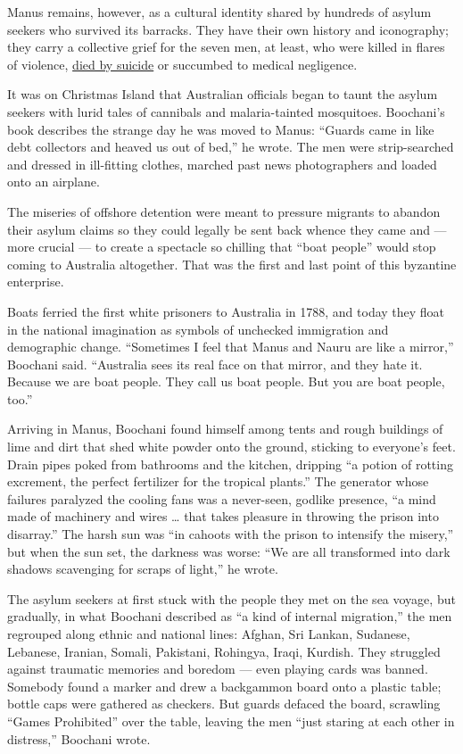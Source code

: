 Manus remains, however, as a cultural identity shared by hundreds of
asylum seekers who survived its barracks. They have their own history
and iconography; they carry a collective grief for the seven men, at
least, who were killed in flares of violence,
\href{https://www.nytimes.com/2019/06/26/world/australia/australia-manus-suicide.html}{died
by suicide} or succumbed to medical negligence.

It was on Christmas Island that Australian officials began to taunt the
asylum seekers with lurid tales of cannibals and malaria-tainted
mosquitoes. Boochani's book describes the strange day he was moved to
Manus: ``Guards came in like debt collectors and heaved us out of bed,''
he wrote. The men were strip-searched and dressed in ill-fitting
clothes, marched past news photographers and loaded onto an airplane.

The miseries of offshore detention were meant to pressure migrants to
abandon their asylum claims so they could legally be sent back whence
they came and --- more crucial --- to create a spectacle so chilling
that ``boat people'' would stop coming to Australia altogether. That was
the first and last point of this byzantine enterprise.

Boats ferried the first white prisoners to Australia in 1788, and today
they float in the national imagination as symbols of unchecked
immigration and demographic change. ``Sometimes I feel that Manus and
Nauru are like a mirror,'' Boochani said. ``Australia sees its real face
on that mirror, and they hate it. Because we are boat people. They call
us boat people. But you are boat people, too.''

Arriving in Manus, Boochani found himself among tents and rough
buildings of lime and dirt that shed white powder onto the ground,
sticking to everyone's feet. Drain pipes poked from bathrooms and the
kitchen, dripping ``a potion of rotting excrement, the perfect
fertilizer for the tropical plants.'' The generator whose failures
paralyzed the cooling fans was a never-seen, godlike presence, ``a mind
made of machinery and wires \ldots{} that takes pleasure in throwing the
prison into disarray.'' The harsh sun was ``in cahoots with the prison
to intensify the misery,'' but when the sun set, the darkness was worse:
``We are all transformed into dark shadows scavenging for scraps of
light,'' he wrote.

The asylum seekers at first stuck with the people they met on the sea
voyage, but gradually, in what Boochani described as ``a kind of
internal migration,'' the men regrouped along ethnic and national lines:
Afghan, Sri Lankan, Sudanese, Lebanese, Iranian, Somali, Pakistani,
Rohingya, Iraqi, Kurdish. They struggled against traumatic memories and
boredom --- even playing cards was banned. Somebody found a marker and
drew a backgammon board onto a plastic table; bottle caps were gathered
as checkers. But guards defaced the board, scrawling ``Games
Prohibited'' over the table, leaving the men ``just staring at each
other in distress,'' Boochani wrote.

